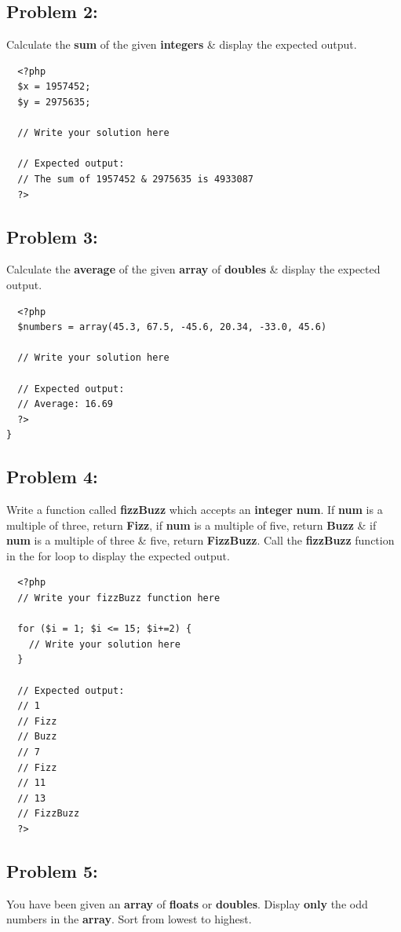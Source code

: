 \documentclass{article}
\begin{document}
\subsection*{Problem 2:} Calculate the \textbf{sum} of the given \textbf{integers} \& display the expected output.

\begin{verbatim}
  <?php
  $x = 1957452;
  $y = 2975635;

  // Write your solution here

  // Expected output:
  // The sum of 1957452 & 2975635 is 4933087
  ?>
\end{verbatim}

\subsection*{Problem 3:} 
Calculate the \textbf{average} of the given \textbf{array} of \textbf{doubles} \& display the expected output.

\begin{verbatim}
  <?php
  $numbers = array(45.3, 67.5, -45.6, 20.34, -33.0, 45.6)

  // Write your solution here

  // Expected output:
  // Average: 16.69 
  ?>
}
\end{verbatim}

\subsection*{Problem 4:}
Write a function called \textbf{fizzBuzz} which accepts an \textbf{integer} \textbf{num}. If \textbf{num} is a multiple of three, return \textbf{Fizz}, if \textbf{num} is a multiple of five, return \textbf{Buzz} \& if \textbf{num} is a multiple of three \& five, return \textbf{FizzBuzz}. Call the \textbf{fizzBuzz} function in the for loop to display the expected output.

\begin{verbatim}
  <?php
  // Write your fizzBuzz function here
  
  for ($i = 1; $i <= 15; $i+=2) {
    // Write your solution here
  }

  // Expected output:
  // 1
  // Fizz
  // Buzz
  // 7
  // Fizz
  // 11
  // 13
  // FizzBuzz
  ?>
\end{verbatim}

\subsection*{Problem 5:}
You have been given an \textbf{array} of \textbf{floats} or \textbf{doubles}. Display \textbf{only} the odd numbers in the \textbf{array}. Sort from lowest to highest.
\end{document}
